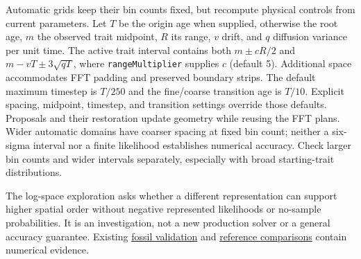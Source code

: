 \documentclass[11pt]{article}
\begin{document}
Automatic grids keep their bin counts fixed, but recompute physical controls from current
parameters. Let $T$ be the origin age when supplied, otherwise the root age, $m$ the observed
trait midpoint, $R$ its range, $v$ drift, and $q$ diffusion variance per unit time. The active
trait interval contains both $m\pm cR/2$ and $m-vT\pm3\sqrt{qT}$, where
\texttt{rangeMultiplier} supplies $c$ (default 5). Additional space accommodates FFT padding
and preserved boundary strips. The default maximum timestep is $T/250$ and the fine/coarse
transition age is $T/10$. Explicit spacing, midpoint, timestep, and transition settings override
those defaults. Proposals and their restoration update geometry while reusing the FFT plans.
Wider automatic domains have coarser spacing at fixed bin count; neither a six-sigma interval
nor a finite likelihood establishes numerical accuracy. Check larger bin counts and wider
intervals separately, especially with broad starting-trait distributions.

The log-space exploration asks whether a different representation can support higher spatial order
without negative represented likelihoods or no-sample probabilities. It is an investigation, not a
new production solver or a general accuracy guarantee. Existing
\href{../../validation/FossilSampling.md}{fossil validation} and
\href{../../validation/QuaSSEReference.md}{reference comparisons} contain numerical evidence.



\end{document}
